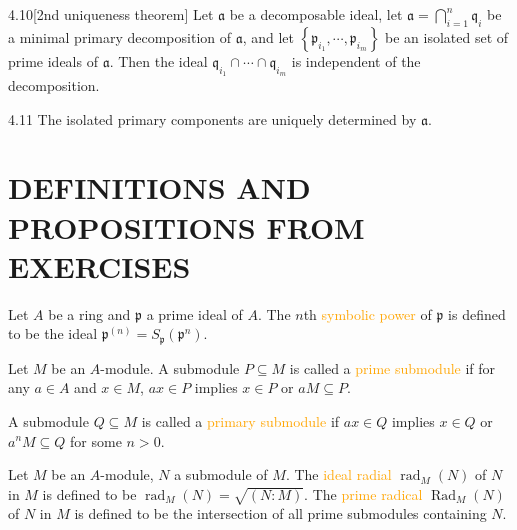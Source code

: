 \begin{proposition}{4.10}[2nd uniqueness theorem]
	Let $\mathfrak{a}$ be a decomposable ideal, let $\mathfrak{a}=\bigcap_{i=1}^n\mathfrak{q}_i$ be a minimal primary decomposition of $\mathfrak{a}$, and let $\left\{\mathfrak{p}_{i_1},\cdots,\mathfrak{p}_{i_m}\right\}$ be an isolated set of prime ideals of $\mathfrak{a}$. Then the ideal $\mathfrak{q}_{i_1}\cap\cdots\cap\mathfrak{q}_{i_m}$ is independent of the decomposition.
\end{proposition}

\begin{corollary}{4.11}
	The isolated primary components are uniquely determined by $\mathfrak{a}$.
\end{corollary}

\section*{DEFINITIONS AND PROPOSITIONS FROM EXERCISES}

\begin{definition}
	Let $A$ be a ring and $\mathfrak{p}$ a prime ideal of $A$. The $n$th \textcolor{orange}{symbolic power} of $\mathfrak{p}$ is defined to be the ideal $\mathfrak{p}^{(n)}=S_\mathfrak{p}\left(\mathfrak{p}^n\right)$.
\end{definition}

\begin{definition}
	Let $M$ be an $A$-module. A submodule $P\subseteq M$ is called a \textcolor{orange}{prime submodule} if for any $a\in A$ and $x\in M$, $ax\in P$ implies $x\in P$ or $aM\subseteq P$.
	
	A submodule $Q\subseteq M$ is called a \textcolor{orange}{primary submodule} if $ax\in Q$ implies $x\in Q$ or $a^nM\subseteq Q$ for some $n>0$.
\end{definition}

\begin{definition}\label{primarymodule}
	Let $M$ be an $A$-module, $N$ a submodule of $M$. The \textcolor{orange}{ideal radial} $\operatorname{rad}_M(N)$ of $N$ in $M$ is defined to be $\operatorname{rad}_M(N)=\sqrt{(N:M)}$. The \textcolor{orange}{prime radical} $\operatorname{Rad}_M(N)$ of $N$ in $M$ is defined to be the intersection of all prime submodules containing $N$.
\end{definition}

